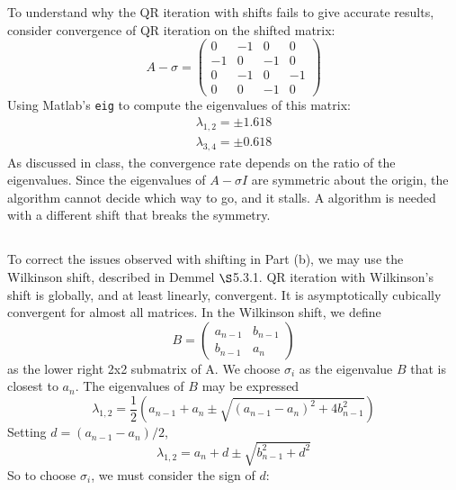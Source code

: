 \documentclass[11pt]{article} %
\begin{document}
To understand why  the QR iteration with shifts fails to give accurate results, consider convergence of QR iteration on the shifted matrix:
\begin{equation}
A - \sigma = \left ( \begin{array}{rrrr}
0 & -1 & 0 & 0\\
-1 & 0 & -1 &0\\
0 & -1 & 0 & -1 \\
0 & 0 & -1 & 0 
\end{array} \right )
\end{equation}
Using Matlab's \verb$eig$ to compute the eigenvalues of this matrix:
\begin{equation}
\begin{split}
\lambda_{1,2} = \pm 1.618\\
\lambda_{3,4} = \pm 0.618
\end{split}
\end{equation}
As discussed in class, the convergence rate depends on the ratio of the eigenvalues. Since the eigenvalues of $A - \sigma I $ are symmetric about the origin, the algorithm cannot decide which way to go, and it stalls. A algorithm is needed with a different shift that breaks the symmetry.
\subsection{} %
To correct the issues observed with shifting in Part (b), we may use the Wilkinson shift, described in Demmel $\S$5.3.1. QR iteration with Wilkinson's shift is globally, and at least linearly, convergent. It is asymptotically cubically convergent for almost all matrices. In the Wilkinson shift, we define
\begin{equation}
B = \left ( \begin{array}{cc}
a_{n-1} & b_{n-1} \\
b_{n-1} & a_n
\end{array} \right )
\end{equation}
as the lower right 2x2 submatrix of A.
We choose $\sigma_i$ as the eigenvalue $B$ that is closest to $a_n$. The eigenvalues of $B$ may be expressed
\begin{equation}
\lambda_{1,2} = \frac{1}{2}\left (a_{n-1} + a_n \pm \sqrt{(a_{n-1}-a_n)^2 + 4b_{n-1}^2} \right )
\end{equation}
Setting $d= (a_{n-1}-a_n)/2$,
\begin{equation}
\lambda_{1,2}  = a_n + d \pm \sqrt{b_{n-1}^2 + d^2}
\end{equation}
So to choose $\sigma_i$, we must consider the sign of $d$:
\end{document}

